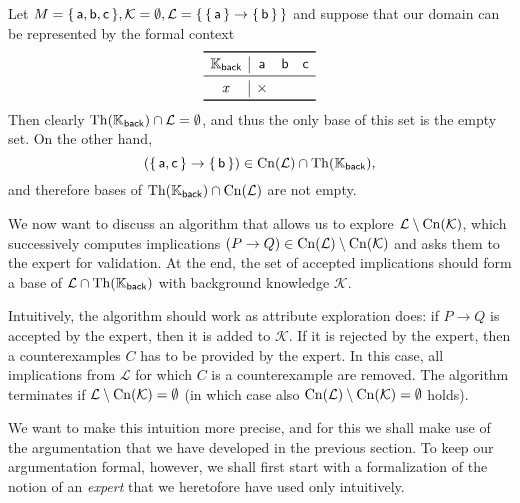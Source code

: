 \begin{Example}
  \label{expl:why-exploring-implications-is-different}
  Let $M = {\{\, \mathsf{a}, \mathsf{b}, \mathsf{c} \,\}}, \mathcal{K} = \emptyset,
  \mathcal{L} = {\{\, {\{\, \mathsf{a} \,\}} \to {\ensuremath{\{\, \mathsf{b} \,\}}} \,\}}$ and suppose that our
  domain can be represented by the formal context
  \begin{equation*}
    \begin{array}{c|ccc}
      \toprule
      \con K_{\mathsf{back}} & \mathsf{a} & \mathsf{b} & \mathsf{c} \\
      \midrule
      x & \times \\
      \bottomrule
    \end{array}
  \end{equation*}
  Then clearly $\operatorname{Th}({\mathbb{K}}_{\mathsf{back}}) \cap \mathcal{L} = \emptyset$, and thus the
  only base of this set is the empty set.  On the other hand,
  \begin{equation*}
    ({\{\, \mathsf{a}, \mathsf{c} \,\}} \to {\ensuremath{\{\, \mathsf{b} \,\}}}) \in
    \operatorname{Cn}(\mathcal{L}) \cap \operatorname{Th}({\mathbb{K}}_{\mathsf{back}}),
  \end{equation*}
  and therefore bases of $\operatorname{Th}({\mathbb{K}}_{\mathsf{back}}) \cap \operatorname{Cn}(\mathcal{L})$ are not empty.
\end{Example}

We now want to discuss an algorithm that allows us to explore $\mathcal{L} \setminus
\operatorname{Cn}(\mathcal{K})$, \ie which successively computes implications $(P \to Q) \in
\operatorname{Cn}(\mathcal{L}) \setminus \operatorname{Cn}(\mathcal{K})$ and asks them to the expert for validation.
At the end, the set of accepted implications should form a base of $\mathcal{L} \cap
\operatorname{Th}({\mathbb{K}}_{\mathsf{back}})$ with background knowledge $\mathcal{K}$.

Intuitively, the algorithm should work as attribute exploration does: if $P \to Q$ is
accepted by the expert, then it is added to $\mathcal{K}$.  If it is rejected by the
expert, then a counterexamples $C$ has to be provided by the expert.  In this case, all
implications from $\mathcal{L}$ for which $C$ is a counterexample are removed.  The
algorithm terminates if $\mathcal{L} \setminus \operatorname{Cn}(\mathcal{K}) = \emptyset$ (in which
case also $\operatorname{Cn}(\mathcal{L}) \setminus \operatorname{Cn}(\mathcal{K}) = \emptyset$ holds).

We want to make this intuition more precise, and for this we shall make use of the
argumentation that we have developed in the previous section.  To keep our argumentation
formal, however, we shall first start with a formalization of the notion of an
\emph{expert} that we heretofore have used only intuitively.

